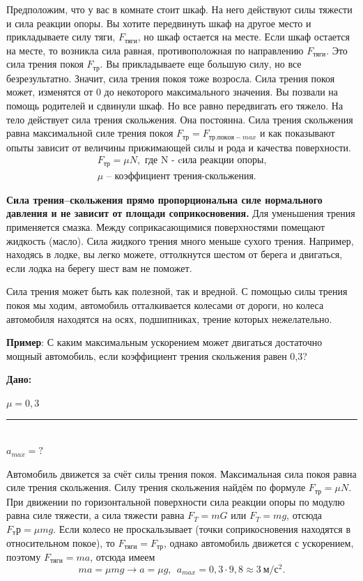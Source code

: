 \documentclass[a6paper, 11pt]{diss_4}
\renewcommand{\'}{\,'}
\begin{document}
Предположим, что у вас в комнате стоит шкаф. На него действуют силы тяжести и сила реакции опоры. Вы хотите передвинуть шкаф на другое место и прикладываете силу тяги, $F_{тяги}$, но шкаф остается на месте. Если шкаф остается на месте, то возникла сила равная, противоположная по направлению $F_{тяги}$.  Это сила трения покоя $F_{тр}$. Вы прикладываете еще большую силу, но все безрезультатно. Значит, сила трения покоя тоже возросла. Сила трения покоя может, изменятся от $0$ до некоторого максимального значения. Вы позвали на помощь родителей и сдвинули шкаф. Но все равно передвигать его тяжело. На тело действует сила трения скольжения. Она постоянна. Сила трения скольжения равна максимальной силе трения покоя $F_{тр}=F_{тр.покоя-max}$ и как показывают опыты зависит от величины прижимающей силы и рода и качества поверхности.
\begin{gather*}
F_{тр}=\mu N,\text{ где N - cила реакции опоры,}\\
\mu\text{ -- коэффициент трения-скольжения. }
\end{gather*}


\textbf{Сила трения--скольжения прямо пропорциональна силе нормального давления и не зависит от площади соприкосновения.} Для уменьшения трения применяется смазка. Между соприкасающимися поверхностями помещают жидкость (масло). Сила жидкого трения много меньше сухого трения. Например, находясь в лодке, вы легко можете, оттолкнутся шестом от берега и двигаться, если лодка на берегу шест вам не поможет.

Сила трения может быть как полезной, так и вредной. С помощью силы трения покоя мы ходим, автомобиль отталкивается колесами от дороги, но колеса автомобиля находятся на осях, подшипниках, трение которых нежелательно.

\textbf{Пример}: С каким максимальным ускорением может двигаться достаточно мощный автомобиль, если коэффициент трения скольжения равен 0,3?

\hspace{1cm}\textbf{Дано:}\hspace{.3cm}
\parbox[t]{4cm}{
$\mu= 0,3$\\
\rule{4cm}{.4pt}\\
$a_{max} = ?$\\
}


Автомобиль движется за счёт силы трения покоя.
Максимальная сила покоя равна силе трения скольжения.
Силу трения скольжения найдём по формуле $F_{тр}=\mu N$.
При движении по горизонтальной поверхности сила реакции опоры по модулю равна силе тяжести, а сила тяжести
равна $F_T=mG$ или $F_T=mg$, отсюда  $F_тр=\mu mg$. Если колесо не проскальзывает (точки соприкосновения находятся
в относительном покое), то $F_{тяги}=F_{тр}$, однако автомобиль движется с ускорением, поэтому $F_{тяги}=ma$, отсюда имеем
\[
ma=\mu mg\to a=\mu g,\ \ a_{max}=0,3\cdot9,8\approx 3\ м/с^2.
\]
\end{document}
